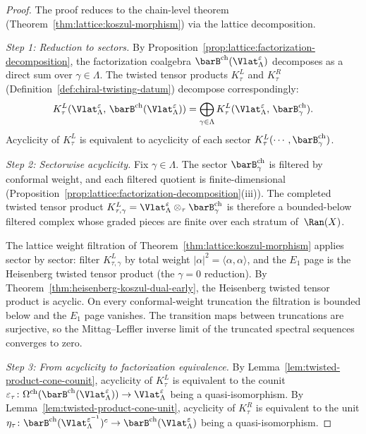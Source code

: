 \begin{proof}
The proof reduces to the chain-level theorem
(Theorem~\ref{thm:lattice:koszul-morphism}) via the lattice
decomposition.

\emph{Step 1: Reduction to sectors.}
By Proposition~\ref{prop:lattice:factorization-decomposition}, the
factorization coalgebra
$\barB^{\mathrm{ch}}(\Vlat_\Lambda^\varepsilon)$ decomposes as a
direct sum over $\gamma \in \Lambda$. The twisted tensor products
$K_\tau^L$ and $K_\tau^R$
(Definition~\ref{def:chiral-twisting-datum}) decompose
correspondingly:
\[
K_\tau^L(\Vlat_\Lambda^\varepsilon,\,
\barB^{\mathrm{ch}}(\Vlat_\Lambda^\varepsilon))
= \bigoplus_{\gamma \in \Lambda}
K_\tau^L(\Vlat_\Lambda^\varepsilon,\,
\barB^{\mathrm{ch}}_\gamma).
\]
Acyclicity of $K_\tau^L$ is equivalent to acyclicity of each
sector $K_\tau^L(\cdots, \barB^{\mathrm{ch}}_\gamma)$.

\emph{Step 2: Sectorwise acyclicity.}
Fix $\gamma \in \Lambda$. The sector
$\barB^{\mathrm{ch}}_\gamma$ is filtered by conformal weight, and each
filtered quotient is finite-dimensional
\textup{(}Proposition~\ref{prop:lattice:factorization-decomposition}(iii)\textup{)}.
The completed twisted tensor product
$K_{\tau,\gamma}^L = \Vlat_\Lambda^\varepsilon
\otimes_\tau \barB^{\mathrm{ch}}_\gamma$ is therefore a
bounded-below filtered complex whose graded pieces are finite over
each stratum of~$\Ran(X)$.

The lattice weight filtration of
Theorem~\ref{thm:lattice:koszul-morphism} applies sector by
sector: filter $K_{\tau,\gamma}^L$ by total weight
$|\alpha|^2 = \langle\alpha,\alpha\rangle$, and the
$E_1$ page is the Heisenberg twisted tensor product
(the $\gamma = 0$ reduction). By
Theorem~\ref{thm:heisenberg-koszul-dual-early}, the Heisenberg
twisted tensor product is acyclic. On every conformal-weight
truncation the filtration is bounded below and the $E_1$ page
vanishes. The transition maps between truncations are surjective, so
the Mittag--Leffler inverse limit of the truncated spectral sequences
converges to zero.

\emph{Step 3: From acyclicity to factorization equivalence.}
By Lemma~\ref{lem:twisted-product-cone-counit}, acyclicity of
$K_\tau^L$ is equivalent to the counit
$\varepsilon_\tau\colon
\Omega^{\mathrm{ch}}(\barB^{\mathrm{ch}}(\Vlat_\Lambda^\varepsilon))
\to \Vlat_\Lambda^\varepsilon$
being a quasi-isomorphism. By
Lemma~\ref{lem:twisted-product-cone-unit}, acyclicity of
$K_\tau^R$ is equivalent to the unit
$\eta_\tau\colon
\barB^{\mathrm{ch}}(\Vlat_\Lambda^{\varepsilon^{-1}})^c
\to \barB^{\mathrm{ch}}(\Vlat_\Lambda^\varepsilon)$
being a quasi-isomorphism.


\end{proof}
